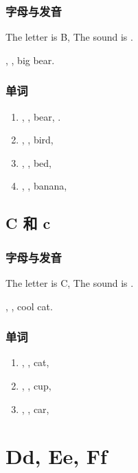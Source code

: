 \subsection{字母与发音}

The letter is B, The sound is .

, , big bear.


\subsection{单词}

\begin{enumerate}
  \item {}, , bear, .
  \item {}, , bird, 
  \item {}, , bed, 
  \item {}, , banana, 
\end{enumerate}




\section{C 和 c}

\subsection{字母与发音}

The letter is C, The sound is .

, , cool cat.

\subsection{单词}

\begin{enumerate}
  \item {}, , cat, 
  \item {}, , cup, 
  \item {}, , car, 
\end{enumerate}





\chapter{Dd, Ee, Ff}


